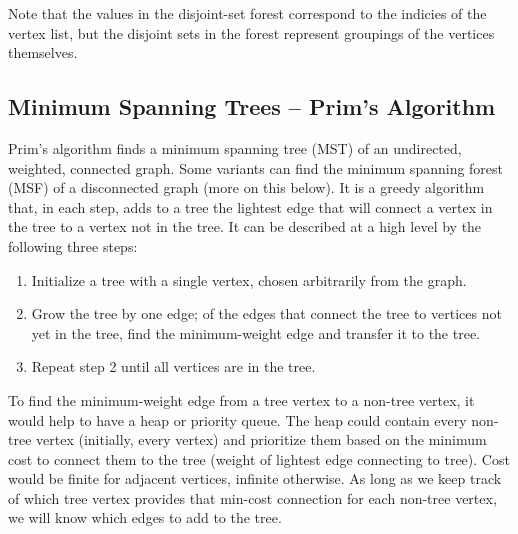 \documentclass[12pt, titlepage]{article}
\begin{document}
Note that the values in the disjoint-set forest correspond to the indicies of the vertex list, but the disjoint sets in the forest represent groupings of the vertices themselves.

\subsection{Minimum Spanning Trees -- Prim's Algorithm} \label{prim}

Prim's algorithm finds a minimum spanning tree (MST) of an undirected, weighted, connected graph. Some variants can find the minimum spanning forest (MSF) of a disconnected graph (more on this below). It is a greedy algorithm that, in each step, adds to a tree the lightest edge that will connect a vertex in the tree to a vertex not in the tree. It can be described at a high level by the following three steps:

\begin{enumerate}
  \item Initialize a tree with a single vertex, chosen arbitrarily from the graph.
  \item Grow the tree by one edge; of the edges that connect the tree to vertices not yet in the tree, find the minimum-weight edge and transfer it to the tree.
  \item Repeat step 2 until all vertices are in the tree.
\end{enumerate}

To find the minimum-weight edge from a tree vertex to a non-tree vertex, it would help to have a heap or priority queue. The heap could contain every non-tree vertex (initially, every vertex) and prioritize them based on the minimum cost to connect them to the tree (weight of lightest edge connecting to tree). Cost would be finite for adjacent vertices, infinite otherwise. As long as we keep track of which tree vertex provides that min-cost connection for each non-tree vertex, we will know which edges to add to the tree. \\
\end{document}

